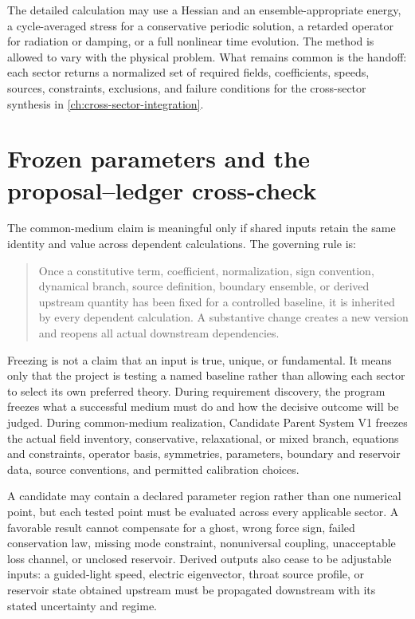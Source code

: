 The detailed calculation may use a Hessian and an ensemble-appropriate energy,
a cycle-averaged stress for a conservative periodic solution, a retarded
operator for radiation or damping, or a full nonlinear time evolution. The
method is allowed to vary with the physical problem. What remains common is the
handoff: each sector returns a normalized set of required fields, coefficients,
speeds, sources, constraints, exclusions, and failure conditions for the
cross-sector synthesis in \cref{ch:cross-sector-integration}.

\section{Frozen parameters and the proposal--ledger cross-check}

The common-medium claim is meaningful only if shared inputs retain the same
identity and value across dependent calculations. The governing rule is:

\begin{quote}
Once a constitutive term, coefficient, normalization, sign convention,
dynamical branch, source definition, boundary ensemble, or derived upstream
quantity has been fixed for a controlled baseline, it is inherited by every
dependent calculation. A substantive change creates a new version and reopens
all actual downstream dependencies.
\end{quote}

Freezing is not a claim that an input is true, unique, or fundamental. It means
only that the project is testing a named baseline rather than allowing each
sector to select its own preferred theory. During requirement discovery, the
program freezes what a successful medium must do and how the decisive outcome
will be judged. During common-medium realization, Candidate Parent System V1
freezes the actual field inventory, conservative, relaxational, or mixed branch,
equations and constraints, operator basis, symmetries, parameters, boundary and
reservoir data, source conventions, and permitted calibration choices.

A candidate may contain a declared parameter region rather than one numerical
point, but each tested point must be evaluated across every applicable sector.
A favorable result cannot compensate for a ghost, wrong force sign, failed
conservation law, missing mode constraint, nonuniversal coupling, unacceptable
loss channel, or unclosed reservoir. Derived outputs also cease to be adjustable
inputs: a guided-light speed, electric eigenvector, throat source profile, or
reservoir state obtained upstream must be propagated downstream with its stated
uncertainty and regime.

